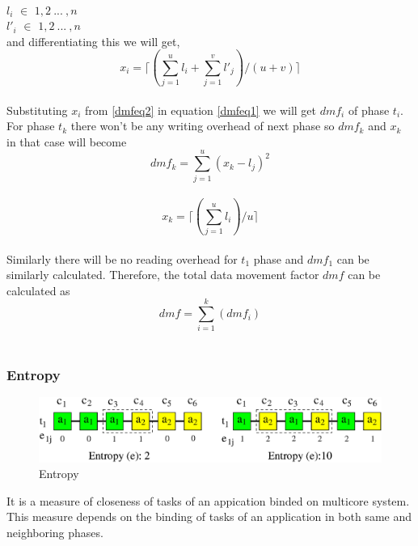 \documentclass[10pt, conference]{IEEEtran}
\begin{document}
\ \\
$l_i$ $\in$ ${1, 2\:...\:, n}$ \ \\
$l'_i$ $\in$ ${1, 2\:...\:, n}$ \ \\
and differentiating this we will get, \ \\
\begin{equation} 
x_i=\lceil(\sum_{j=1}^{u} l_i + \sum_{j=1}^{v} l'_j) /(u+v) \rceil
\label{dmfeq2}
\end{equation} 
\ \\
Substituting $x_i$ from \ref{dmfeq2} in equation \ref{dmfeq1} we will get $dmf_i$ of phase $t_i$. For phase $t_k$ there won't be any writing overhead of next phase so $dmf_k$ and $x_k$ in that case will become 
\begin{equation} 
dmf_k=\sum_{j=1}^{u}(x_k-l_j)^2
\label{dmfeq3}
\end{equation}
\ \\
\begin{equation} 
x_k =\lceil(\sum_{j=1}^{u} l_i) /u \rceil
\label{dmfeq4}
\end{equation} 
\ \\
Similarly there will be no reading overhead for $t_1$ phase and $dmf_1$ can be similarly calculated. Therefore, the total data movement factor $dmf$ can be calculated as 
\begin{equation} 
dmf = \sum_{i=1}^{k}(dmf_i)
\label{dmfeq5}
\end{equation} 
\ \\
\subsubsection{Entropy}

\begin{figure}[tb]
\centering 
\includegraphics[scale=0.5]{./figure/entropy.eps}
\vspace{0.0cm}\caption{Entropy}
\vspace{-0.1cm}
\label{entropy}
\end{figure}

It is a measure of closeness of tasks of an appication binded on multicore system. This measure depends on the binding of tasks of an application in both same and neighboring phases.
\end{document}
